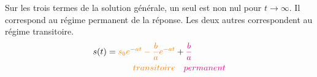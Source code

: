 Sur les trois termes de la solution générale, un seul est non
nul pour $t\to\infty$. Il correspond au régime permanent de
la réponse. Les deux autres correspondent au régime transitoire.
\begin{align*}
    s(t)=\textcolor{orange}{s_0e^{-at}-\dfrac{b}{a}e^{-at}}&+\textcolor{magenta}{\dfrac{b}{a}}\\
    \textcolor{orange}{transitoire} &\quad\textcolor{magenta}{permanent}
\end{align*}
